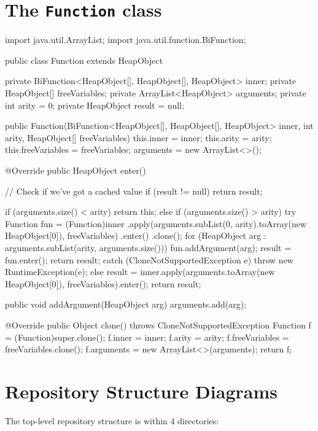 \documentclass[dissertation.tex]{subfiles}
\begin{document}
\begin{appendices}
\chapter{The \texttt{Function} class}\label{appendix:function}
{
    \begin{javafigure}
import java.util.ArrayList;
import java.util.function.BiFunction;

public class Function extends HeapObject {
    private BiFunction<HeapObject[], HeapObject[], HeapObject> inner;
    private HeapObject[] freeVariables;
    private ArrayList<HeapObject> arguments;
    private int arity = 0;
    private HeapObject result = null;

    public Function(BiFunction<HeapObject[], HeapObject[], HeapObject> inner, int arity, HeapObject[] freeVariables) {
        this.inner = inner;
        this.arity = arity;
        this.freeVariables = freeVariables;
        arguments = new ArrayList<>();
    }

    @Override
    public HeapObject enter() {
        // Check if we've got a cached value
        if (result != null) {
            return result;
        }

        if (arguments.size() < arity) {
            return this;
        }
        else if (arguments.size() > arity) {
            try {
                Function fun = (Function)inner
                    .apply(arguments.subList(0, arity).toArray(new HeapObject[0]), freeVariables)
                    .enter()
                    .clone();
                for (HeapObject arg : arguments.subList(arity, arguments.size()))
                    fun.addArgument(arg);
                result = fun.enter();
                return result;
            }
            catch (CloneNotSupportedException e) {
                throw new RuntimeException(e);
            }
        }
        else {
            result = inner.apply(arguments.toArray(new HeapObject[0]), freeVariables).enter();
            return result;
        }
    }

    public void addArgument(HeapObject arg) {
        arguments.add(arg);
    }

    @Override
    public Object clone() throws CloneNotSupportedException {
        Function f = (Function)super.clone();
        f.inner = inner;
        f.arity = arity;
        f.freeVariables = freeVariables.clone();
        f.arguments = new ArrayList<>(arguments);
        return f;
    }
}
    \end{javafigure}
}
\chapter{Repository Structure Diagrams}\label{appendix:directory-structure}
{
    The top-level repository structure is within 4 directories:

}
\end{appendices}
\end{document}

